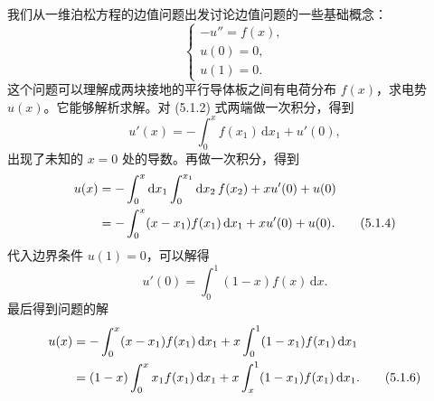 我们从一维泊松方程的边值问题出发讨论边值问题的一些基础概念：
\begin{equation}
\begin{cases}
-u''=f(x),\\
u(0)=0,\\
u(1)=0.
\end{cases}
\tag{5.1.2}
\end{equation}
这个问题可以理解成两块接地的平行导体板之间有电荷分布 $f(x)$，求电势 $u(x)$。它能够解析求解。对 (5.1.2) 式两端做一次积分，得到
\begin{equation}
u'(x)=-\int_0^x f(x_1)\,\mathrm dx_1+u'(0),
\tag{5.1.3}
\end{equation}
出现了未知的 $x=0$ 处的导数。再做一次积分，得到
\begin{align}
u(x)&=-\int_0^x\mathrm dx_1\int_0^{x_1}\mathrm dx_2\,f(x_2)+xu'(0)+u(0)\notag\\
&=-\int_0^x(x-x_1)f(x_1)\,\mathrm dx_1+xu'(0)+u(0).
\tag{5.1.4}
\end{align}
代入边界条件 $u(1)=0$，可以解得
\begin{equation}
u'(0)=\int_0^1(1-x)f(x)\,\mathrm dx.
\tag{5.1.5}
\end{equation}
最后得到问题的解
\begin{align}
u(x)&=-\int_0^x(x-x_1)f(x_1)\,\mathrm dx_1+x\int_0^1(1-x_1)f(x_1)\,\mathrm dx_1\notag\\
&=(1-x)\int_0^x x_1f(x_1)\,\mathrm dx_1+x\int_x^1(1-x_1)f(x_1)\,\mathrm dx_1.
\tag{5.1.6}
\end{align}

